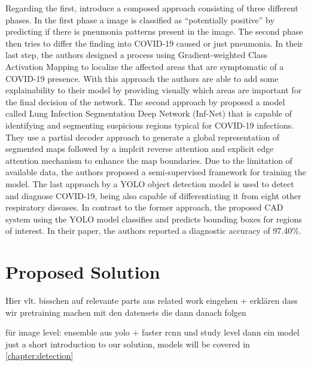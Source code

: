 Regarding the first, \citeauthor{brunese2020explainable} \autocite{brunese2020explainable} introduce a composed approach consisting of three different phases. In the first phase a image is classified as \enquote{potentially positive} by predicting if there is pneumonia patterns present in the image. The second phase then tries to differ the finding into COVID-19 caused or just pneumonia. In their last step, the authors designed a process using Gradient-weighted Class Activation Mapping to localize the affected areas that are symptomatic of a COVID-19 presence. With this approach the authors are able to add some explainability to their model by providing visually which areas are important for the final decision of the network.\newline
The second approach by \citeauthor{fan2020inf} \autocite{fan2020inf} proposed a model called Lung Infection Segmentation Deep Network (Inf-Net) that is capable of identifying and segmenting suspicious regions typical for COVID-19 infections. They use a partial decoder approach to generate a global representation of segmented maps followed by a implcit reverse attention and explicit edge attention mechanism to enhance the map boundaries. Due to the limitation of available data, the authors proposed a semi-supervised framework for training the model.\newline
The last approach by \citeauthor{al2021fast} \autocite{al2021fast} a \ac{YOLO} object detection model \autocite{yoloOriginal} is used to detect and diagnose COVID-19, being also capable of differentiating it from eight other respiratory diseases. In contrast to the former approach, the proposed \ac{CAD} system using the \ac{YOLO} model classifies and predicts bounding boxes for regions of interest. In their paper, the authors reported a diagnostic accuracy of 97.40\%.




\section{Proposed Solution}
 Hier vlt. bisschen auf relevante parts aus related work eingehen + erklären dass wir pretraining machen mit den datensets die dann danach folgen

für image level: ensemble aus yolo + faster rcnn und study level dann ein model 
just a short introduction to our solution, models will be covered in \vref{chapter:detection}